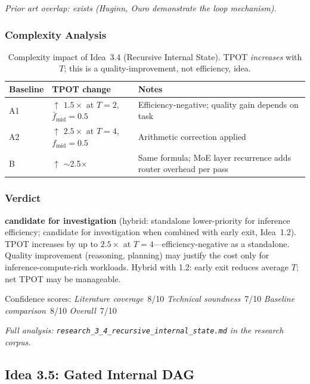\documentclass[11pt]{article}
\begin{document}
\noindent
\emph{Prior art overlap: exists (Huginn, Ouro demonstrate the loop mechanism).}

\subsubsection*{Complexity Analysis}

\begin{table}[h]
\centering
\caption{Complexity impact of Idea~3.4 (Recursive Internal State).
TPOT \emph{increases} with $T$; this is a quality-improvement, not efficiency, idea.}
\label{tab:complexity-3-4}
\begin{tabular}{llp{7cm}}
\toprule
\textbf{Baseline} & \textbf{TPOT change} & \textbf{Notes} \\
\midrule
A1 & $\uparrow$ $1.5\times$ at $T{=}2$, $\bar{f}_\text{mid}{=}0.5$ & Efficiency-negative; quality gain depends on task \\
A2 & $\uparrow$ $2.5\times$ at $T{=}4$, $f_\text{mid}{=}0.5$ & Arithmetic correction applied \\
B  & $\uparrow$ $\sim$2.5$\times$ & Same formula; MoE layer recurrence adds router overhead per pass \\
\bottomrule
\end{tabular}
\end{table}

\subsubsection*{Verdict}
\textbf{candidate for investigation} (hybrid: standalone lower-priority for inference efficiency; candidate for investigation when combined with early exit, Idea~1.2).
TPOT increases by up to $2.5\times$ at $T=4$---efficiency-negative as a standalone.
Quality improvement (reasoning, planning) may justify the cost only for inference-compute-rich workloads.
Hybrid with 1.2: early exit reduces average $T$; net TPOT may be manageable.

\noindent
Confidence scores:
\emph{Literature coverage}~8/10 \quad
\emph{Technical soundness}~7/10 \quad
\emph{Baseline comparison}~8/10 \quad
\emph{Overall}~7/10

\par\noindent\textit{Full analysis: \texttt{research\_3\_4\_recursive\_internal\_state.md} in the research corpus.}

\subsection{Idea 3.5: Gated Internal DAG}
\label{subsec:idea-3-5}
\end{document}
